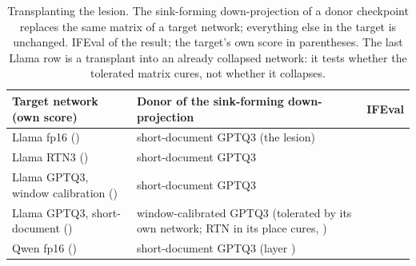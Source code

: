 \begin{table}[t]
\caption{Transplanting the lesion. The sink-forming down-projection of a donor checkpoint replaces the same matrix of a target network; everything else in the target is unchanged. IFEval of the result; the target's own score in parentheses. The last Llama row is a transplant into an already collapsed network: it tests whether the tolerated matrix cures, not whether it collapses.}
\label{tab:transplant}
\begin{center}
\footnotesize\begin{tabular}{>{\raggedright\arraybackslash}p{5.0cm}>{\raggedright\arraybackslash}p{6.2cm}c}
\toprule
Target network (own score) & Donor of the sink-forming down-projection & IFEval \\
\midrule
Llama fp16 (\LfpIF{})                          & short-document GPTQ3 (the lesion) & \TPfp{} \\
Llama RTN3 (\LrtnIF{})                         & short-document GPTQ3              & \TPrtn{} \\
Llama GPTQ3, window calibration (\LcwinIF{})   & short-document GPTQ3              & \TPcwin{} \\
Llama GPTQ3, short-document (\LgptqIF{})       & window-calibrated GPTQ3 (tolerated by its own network; RTN in its place cures, \LoneMatrixIF{}) & \TPshort{} \\
Qwen fp16 (\QfpIF{})                           & short-document GPTQ3 (layer \QlesionLayer{}) & \TPqfp{} \\
\bottomrule
\end{tabular}
\end{center}
\end{table}
